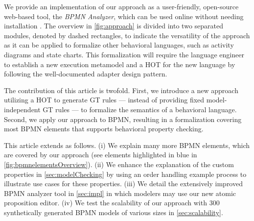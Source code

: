 \documentclass{lmcs} %
\begin{document}
We provide an implementation of our approach as a user-friendly, open-source web-based tool, the \textit{BPMN Analyzer}, which can be used online without needing installation \cite{timkrauterLMCS2024Artifacts2023}.
The overview in \autoref{fig:approach} is divided into two separated modules, denoted by dashed rectangles, to indicate the versatility of the approach as it can be applied to formalize other behavioral languages, such as activity diagrams and state charts. %
This formalization will require the language engineer to establish a new execution metamodel and a HOT for the new language by following the well-documented adapter design pattern.


The contribution of this article is twofold.
First, we introduce a new approach utilizing a HOT to generate GT rules --- instead of providing fixed model-independent GT rules --- to formalize the semantics of a behavioral language.
Second, we apply our approach to BPMN, resulting in a formalization covering most BPMN elements that supports behavioral property checking.

This article extends \cite{krauterFormalizationAnalysisBPMN2023} as follows.
(i) We explain many more BPMN elements, which are covered by our approach (see elements highlighted in blue in \autoref{fig:bpmnelementsOverview}).
(ii) We enhance the explanation of the custom properties in \autoref{sec:modelChecking} by using an order handling example process to illustrate use cases for these properties.
(iii) We detail the extensively improved BPMN analyzer tool in \autoref{sec:impl} in which modelers may use our new atomic proposition editor. %
(iv) We test the scalability of our approach with 300 synthetically generated BPMN models of various sizes in \autoref{sec:scalability}. 
\end{document}
